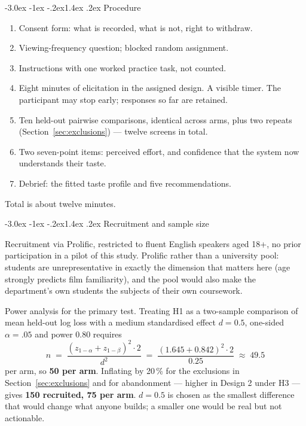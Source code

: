\documentclass[11pt,a4paper]{article}
\makeatletter
\renewcommand\subsection{\@startsection{subsection}{2}{\z@}%
  {-3.0ex \@plus -1ex \@minus -.2ex}{1.4ex \@plus .2ex}%
  {\normalfont\large\sffamily\bfseries\color{accent}}}
\newenvironment{steps}
  {\begin{enumerate}\setlength{\itemsep}{0.15em}\setlength{\parskip}{0.15em}}
  {\end{enumerate}}
\makeatother
\begin{document}
\subsection{Procedure}

\begin{steps}
\item Consent form: what is recorded, what is not, right to withdraw.
\item Viewing-frequency question; blocked random assignment.
\item Instructions with one worked practice task, not counted.
\item Eight minutes of elicitation in the assigned design. A visible timer. The
  participant may stop early; responses so far are retained.
\item Ten held-out pairwise comparisons, identical across arms, plus two repeats
  (Section~\ref{sec:exclusions}) --- twelve screens in total.
\item Two seven-point items: perceived effort, and confidence that the system
  now understands their taste.
\item Debrief: the fitted taste profile and five recommendations.
\end{steps}

Total is about twelve minutes.

\subsection{Recruitment and sample size}

Recruitment via Prolific, restricted to fluent English speakers aged 18+, no
prior participation in a pilot of this study. Prolific rather than a university
pool: students are unrepresentative in exactly the dimension that matters here
(age strongly predicts film familiarity), and the pool would also make the
department's own students the subjects of their own coursework.

Power analysis for the primary test. Treating H1 as a two-sample comparison of
mean held-out log loss with a medium standardised effect $d = 0.5$, one-sided
$\alpha = .05$ and power $0.80$ requires
\[
  n \;=\; \frac{(z_{1-\alpha} + z_{1-\beta})^2 \cdot 2}{d^2}
    \;=\; \frac{(1.645 + 0.842)^2 \cdot 2}{0.25} \;\approx\; 49.5
\]
per arm, so \textbf{50 per arm}. Inflating by 20\,\% for the exclusions in
Section~\ref{sec:exclusions} and for abandonment --- higher in Design 2 under
H3 --- gives \textbf{150 recruited, 75 per arm}. $d = 0.5$ is chosen as the
smallest difference that would change what anyone builds; a smaller one would be
real but not actionable.
\end{document}
